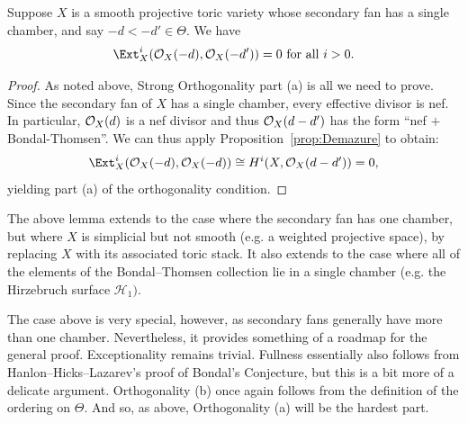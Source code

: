 \documentclass{amsart}
\begin{document}
\begin{lemma}
    Suppose $X$ is a smooth projective toric variety whose secondary fan has a single chamber, and say $-d < -d' \in \Theta$. We have
    \[
    \Ext^i_{X}(\cO_{X}(-d), \cO_{X}(-d')) = 0 \text{ for all } i>0.
    \]
\end{lemma}
\begin{proof}
As noted above, Strong Orthogonality part (a) is all we need to prove.
Since the secondary fan of $X$ has a single chamber, every effective divisor is nef.  In particular, ${\mathcal O}_X(d)$ is a nef divisor and thus ${\mathcal O}_X(d-d')$ has the form ``nef $+$ Bondal-Thomsen''.  We can thus apply Proposition~\ref{prop:Demazure} to obtain: 
\[
\Ext^i_{X}(\cO_{X}(-d), \cO_{X}(-d)) \cong  H^i(X, \cO_{X}(d - d')) = 0,
\]
yielding part (a) of the orthogonality condition.
\end{proof}

The above lemma extends to the case where the secondary fan has one chamber, but where $X$ is simplicial but not smooth (e.g. a weighted projective space), by replacing $X$ with its associated toric stack.   It also extends to the case where all of the elements of the Bondal--Thomsen collection lie in a single chamber (e.g. the Hirzebruch surface $\mathcal H_1)$.

\bigskip

The case above is very special, however, as secondary fans generally have more than one chamber.  Nevertheless, it provides something of a roadmap for the general proof.  Exceptionality remains trivial.  Fullness essentially also follows from Hanlon--Hicks--Lazarev's proof of  Bondal's Conjecture, but this is a bit more of a delicate argument.  %
Orthogonality (b) once again follows from the definition of the ordering on $\Theta$.  And so, as above, Orthogonality (a) will be the hardest part.
\end{document}
